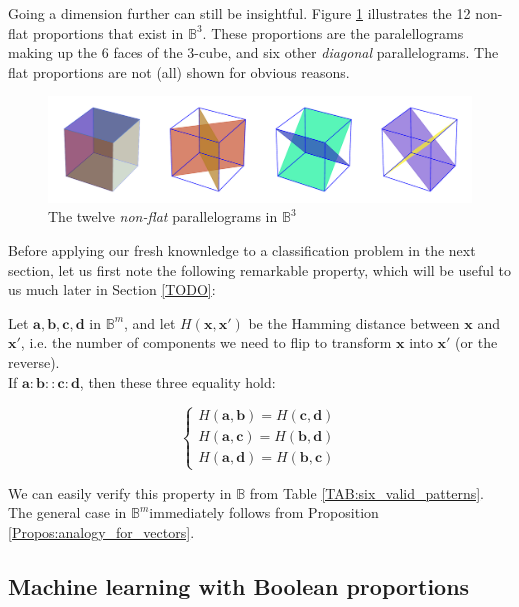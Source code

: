Going a dimension further can still be insightful. Figure \ref{FIG:cubes_in_B3}
illustrates the 12 non-flat proportions that exist in $\mathbb{B}^3$. These
proportions are the paralellograms making up the 6 faces of the $3$-cube, and
six other \textit{diagonal} parallelograms. The flat proportions are not (all)
shown for obvious reasons.

\begin{figure}[!h]
\centering
\includegraphics[width=\linewidth]{figures/cubes_in_B3.pdf}
  \caption{The twelve \textit{non-flat} parallelograms in $\mathbb{B}^3$}
\label{FIG:cubes_in_B3}
\end{figure}

Before applying our fresh knownledge to a classification problem in the next
section, let us first note the following remarkable property, which will be
useful to us much later in Section \ref{TODO}:

\begin{property}
  Let $\mathbf{a}, \mathbf{b},\mathbf{c}, \mathbf{d}$ in $\mathbb{B}^m$, and
  let $H(\mathbf{x}, \mathbf{x'})$ be the Hamming distance between $\mathbf{x}$
  and $\mathbf{x'}$, i.e. the number of components we need to flip to transform
  $\mathbf{x}$ into $\mathbf{x'}$ (or the reverse).\\
  If $\mathbf{a} : \mathbf{b}
  :: \mathbf{c} : \mathbf{d}$, then these three equality hold:

  $$
  \begin{cases}
    H(\mathbf{a}, \mathbf{b}) = H(\mathbf{c}, \mathbf{d})\\
    H(\mathbf{a}, \mathbf{c}) = H(\mathbf{b}, \mathbf{d})\\
    H(\mathbf{a}, \mathbf{d}) = H(\mathbf{b}, \mathbf{c})
  \end{cases}
  $$
\end{property}

We can easily verify this property in $\mathbb{B}$ from Table
\ref{TAB:six_valid_patterns}. The general case in $\mathbb{B}^m $immediately
follows from Proposition \ref{Propos:analogy_for_vectors}.

\subsection{Machine learning with Boolean proportions}

